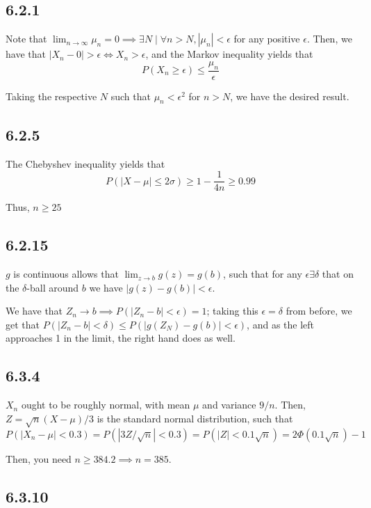 \documentclass[12pt,letterpaper]{article}
\theoremstyle{definition}
\begin{document}
\subsection*{6.2.1}

Note that $\lim_{n\rightarrow \infty} \mu_n = 0 \implies \exists N \mid \forall
n > N, |\mu_n| < \epsilon$ for any positive $\epsilon$. Then, we have that $|X_n
- 0| > \epsilon \iff X_n > \epsilon$, and the Markov inequality yields that
\[
  P(X_n \geq \epsilon) \leq \frac{\mu_n}{\epsilon}
\]

Taking the respective $N$ such that $\mu_n < \epsilon^2$ for $n > N$, we have
the desired result.

\subsection*{6.2.5}

The Chebyshev inequality yields that
\[
  P(|X - \mu| \leq 2\sigma) \geq 1 - \frac{1}{4n} \geq 0.99
\]

Thus, $n \geq 25$

\subsection*{6.2.15}

$g$ is continuous allows that $\lim_{z \rightarrow b}g(z) = g(b)$, such that for
any $\epsilon \exists \delta$ that on the $\delta$-ball around $b$ we have
$|g(z) - g(b)| < \epsilon$.

We have that $Z_n \rightarrow b \implies P(|Z_n - b| < \epsilon) = 1$; taking
this $\epsilon = \delta$ from before, we get that $P(|Z_n - b| < \delta) \leq
P(|g(Z_N) - g(b)| < \epsilon)$, and as the left approaches 1 in the limit, the
right hand does as well.

\subsection*{6.3.4}

$X_n$ ought to be roughly normal, with mean $\mu$ and variance $9 / n$.
Then, $Z = \sqrt{n}(X - \mu)/3$ is the standard normal distribution, such that
\[
  P(|X_n - \mu| < 0.3) = P(|3Z/\sqrt{n}| <  0.3) = P(|Z| < 0.1\sqrt{n}) =
  2\Phi(0.1\sqrt{n}) - 1
\]

Then, you need $n \geq 384.2 \implies n = 385$.

\subsection*{6.3.10}
\end{document}
